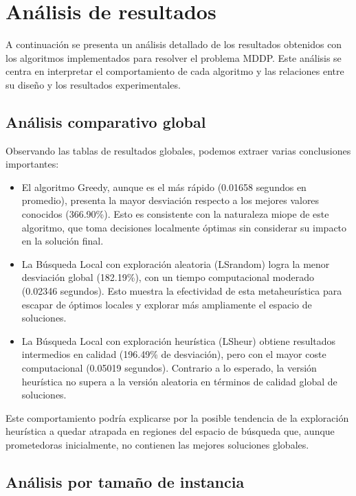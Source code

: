 \documentclass{article}
\begin{document}
\newpage
\section{Análisis de resultados}

A continuación se presenta un análisis detallado de los resultados obtenidos con los algoritmos implementados para resolver el problema MDDP. Este análisis se centra en interpretar el comportamiento de cada algoritmo y las relaciones entre su diseño y los resultados experimentales.

\subsection{Análisis comparativo global}

Observando las tablas de resultados globales, podemos extraer varias conclusiones importantes:

\begin{itemize}
    \item El algoritmo Greedy, aunque es el más rápido (0.01658 segundos en promedio), presenta la mayor desviación respecto a los mejores valores conocidos (366.90\%). Esto es consistente con la naturaleza miope de este algoritmo, que toma decisiones localmente óptimas sin considerar su impacto en la solución final.
    
    \item La Búsqueda Local con exploración aleatoria (LSrandom) logra la menor desviación global (182.19\%), con un tiempo computacional moderado (0.02346 segundos). Esto muestra la efectividad de esta metaheurística para escapar de óptimos locales y explorar más ampliamente el espacio de soluciones.
    
    \item La Búsqueda Local con exploración heurística (LSheur) obtiene resultados intermedios en calidad (196.49\% de desviación), pero con el mayor coste computacional (0.05019 segundos). Contrario a lo esperado, la versión heurística no supera a la versión aleatoria en términos de calidad global de soluciones.
\end{itemize}

Este comportamiento podría explicarse por la posible tendencia de la exploración heurística a quedar atrapada en regiones del espacio de búsqueda que, aunque prometedoras inicialmente, no contienen las mejores soluciones globales.

\subsection{Análisis por tamaño de instancia}
\end{document}
